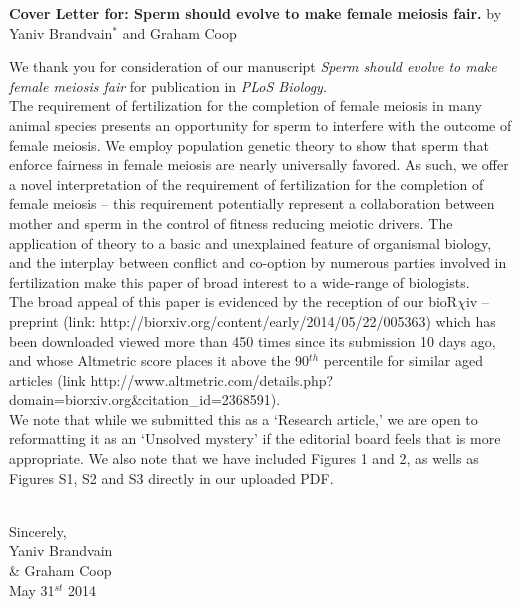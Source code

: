 \documentclass[10pt]{article}
\date{}
\begin{document}
\begin{flushleft}
\textbf{Cover Letter for: Sperm should evolve to make female meiosis fair.}
\newline by Yaniv Brandvain$^{\ast}$ and  Graham Coop \\

\end{flushleft}

We thank you for consideration of our manuscript \emph{Sperm should evolve to make female meiosis fair} for publication in \emph{PLoS Biology}. 
\\ 

The requirement of fertilization for the completion of female meiosis in many animal species presents an opportunity for sperm to interfere with the outcome of female meiosis. We employ population genetic theory to show that sperm that enforce fairness in female meiosis are nearly universally favored. As such, we offer a novel interpretation of the requirement of fertilization for the completion of female meiosis -- this requirement potentially represent a collaboration between mother and sperm in the control of fitness reducing meiotic drivers. The application of theory to a basic and unexplained feature of organismal biology, and the interplay between conflict and co-option by numerous parties involved in fertilization make this paper of broad interest to a wide-range of biologists.
\\

The broad appeal of this paper is evidenced by the reception of our bioR$\chi$iv -- preprint (link: http://biorxiv.org/content/early/2014/05/22/005363) which has been downloaded viewed more than 450 times since its submission 10 days ago, and whose Altmetric score places it above the 90$^{th}$ percentile for similar aged articles (link http://www.altmetric.com/details.php?domain=biorxiv.org\&citation\_id=2368591).
\\

We note that while we submitted this as a `Research article,' we are open to reformatting it as an `Unsolved mystery' if the editorial board feels that is more appropriate.  We also note that we have included Figures 1 and 2, as wells as Figures S1, S2 and S3 directly in our uploaded PDF.
\\
\\ 
\begin{flushright}
Sincerely,\\
Yaniv Brandvain \\ \& Graham Coop\\
May 31$^{st}$ 2014
\end{flushright}
\end{document}
